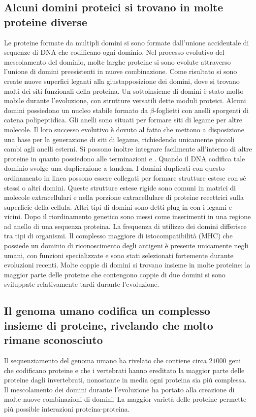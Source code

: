 \subsection{Alcuni domini proteici si trovano in molte proteine diverse}
Le proteine formate da multipli domini si sono formate dall'unione accidentale di sequenze di DNA che codificano ogni dominio. Nel processo evolutivo del mescolamento del dominio, 
molte larghe proteine si sono evolute attraverso l'unione di domini preesistenti in nuove combinazione. Come risultato si sono create nuove superfici leganti alla giustapposizione dei
domini, dove si trovano molti dei siti funzionali della proteina. Un sottoinsieme di domini \`e stato molto mobile durante l'evoluzione, con strutture versatili dette moduli proteici. 
Alcuni domini possiedono un nucleo stabile formato da $\beta$-foglietti con anelli sporgenti di catena polipeptidica. Gli anelli sono situati per formare siti di legame per altre 
molecole. Il loro successo evolutivo \`e dovuto al fatto che mettono a disposizione una base per la generazione di siti di legame, richiedendo unicamente piccoli cambi agli anelli 
esterni. Si possono inoltre integrare facilmente all'interno di altre proteine in quanto possiedono alle terminazioni  e . Quando il DNA codifica tale dominio svolge una
duplicazione a tandem. I domini duplicati con questo ordinamento in linea possono essere collegati per formare strutture estese con s\`e stessi o altri domini. Queste strutture estese
rigide sono comuni in matrici di molecole extracellulari e nella porzione extracellulare di proteine recettrici sulla superficie della cellula. Altri tipi di domini sono detti plug-in
con i legami  e  vicini. Dopo il riordinamento genetico sono messi come inserimenti in una regione ad anello di una sequenza proteina. La frequenza di utilizzo dei domini
differisce tra tipi di organismi. Il complesso maggiore di istocompatibilit\`a (MHC) che possiede un dominio di riconoscimento degli antigeni \`e presente unicamente negli umani, con 
funzioni specializzate e sono stati selezionati fortemente durante evoluzioni recenti. Molte coppie di domini si trovano insieme in molte proteine: la maggior parte delle proteine che
contengono coppie di due domini si sono sviluppate relativamente tardi durante l'evoluzione.
\subsection{Il genoma umano codifica un complesso insieme di proteine, rivelando che molto rimane sconosciuto}
Il sequenziamento del genoma umano ha rivelato che contiene circa $21000$ geni che codificano proteine e che i vertebrati hanno ereditato la maggior parte delle proteine dagli 
invertebrati, nonostante in media ogni proteina sia pi\`u complessa. Il mescolamento dei domini durante l'evoluzione ha portato alla creazione di molte nuove combinazioni di domini. La
maggior variet\`a delle proteine permette pi\`u possible interazioni proteina-proteina.
